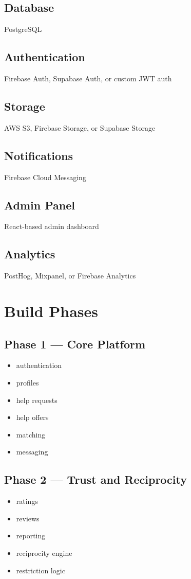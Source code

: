 \documentclass[11pt]{article}
\begin{document}
\subsection{Database}
PostgreSQL

\subsection{Authentication}
Firebase Auth, Supabase Auth, or custom JWT auth

\subsection{Storage}
AWS S3, Firebase Storage, or Supabase Storage

\subsection{Notifications}
Firebase Cloud Messaging

\subsection{Admin Panel}
React-based admin dashboard

\subsection{Analytics}
PostHog, Mixpanel, or Firebase Analytics

\section{Build Phases}

\subsection{Phase 1 --- Core Platform}
\begin{itemize}[leftmargin=1.5em]
    \item authentication
    \item profiles
    \item help requests
    \item help offers
    \item matching
    \item messaging
\end{itemize}

\subsection{Phase 2 --- Trust and Reciprocity}
\begin{itemize}[leftmargin=1.5em]
    \item ratings
    \item reviews
    \item reporting
    \item reciprocity engine
    \item restriction logic
\end{itemize}
\end{document}
